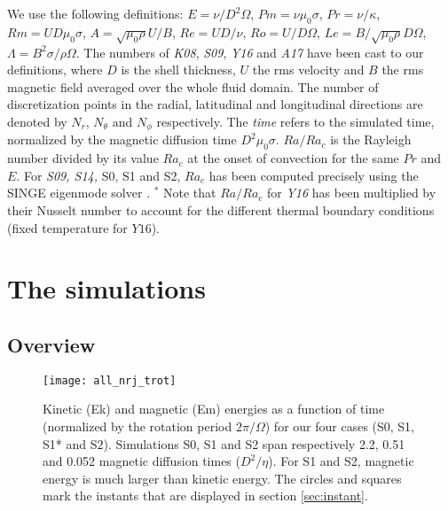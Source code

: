 \documentclass[12pt, a4paper]{article}
\begin{document}
\begin{table}
{We use the following definitions: $E=\nu/D^2\Omega$, $Pm = \nu\mu_0\sigma$, $Pr = \nu/\kappa$, $Rm=UD\mu_0\sigma$, $A=\sqrt{\mu_0\rho}U/B$, $Re=UD/\nu$, $Ro=U/D\Omega$, $Le=B/\sqrt{\mu_0\rho}D\Omega$, $\Lambda=B^2\sigma/\rho\Omega$.
The numbers of \textit{K08}, \textit{S09}, \textit{Y16} and \textit{A17} have been cast to our definitions, where $D$ is the shell thickness, $U$ the rms velocity and $B$ the rms magnetic field averaged over the whole fluid domain.
The number of discretization points in the radial, latitudinal and longitudinal directions are denoted by $N_r$, $N_\theta$ and $N_\phi$ respectively.
The \textit{time} refers to the simulated time, normalized by the magnetic diffusion time $D^2\mu_0\sigma$.
$Ra/Ra_c$ is the Rayleigh number divided by its value $Ra_c$ at the onset of convection for the same $Pr$ and $E$.
For \textit{S09, S14,} S0, S1 and S2, $Ra_c$ has been computed precisely using the SINGE eigenmode solver \citep{vidal2015}.
$^*$ Note that $Ra/Ra_c$ for \textit{Y16} has been multiplied by their Nusselt number to account for the different thermal boundary conditions (fixed temperature for $Y16$).
}
\label{tab:simus}
\end{table}


\section{The simulations}

\subsection{Overview}

\begin{figure}
\texttt{[image: all\_nrj\_trot]}
\caption{Kinetic (Ek) and magnetic (Em) energies as a function of time (normalized by the rotation period $2\pi/\Omega$) for our four cases (S0, S1, S1* and S2).
Simulations S0, S1 and S2 span respectively 2.2, 0.51 and 0.052 magnetic diffusion times ($D^2/\eta$).
For S1 and S2, magnetic energy is much larger than kinetic energy.
The circles and squares mark the instants that are displayed in section \ref{sec:instant}.
}
\label{fig:nrj}
\end{figure}
\end{document}
